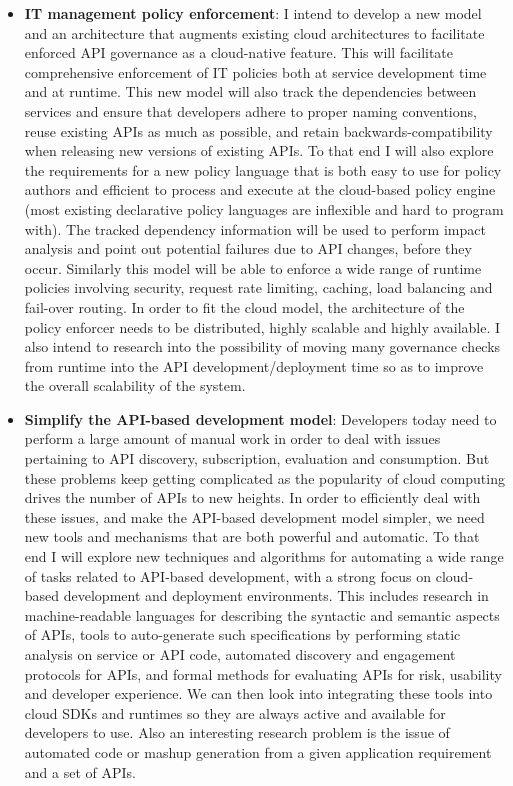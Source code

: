 \begin{itemize}
\item {\bf IT management policy enforcement}: I intend to develop a new
model and an architecture that augments existing cloud architectures to
facilitate enforced API governance as a cloud-native feature. This will
facilitate comprehensive enforcement of IT policies both at service
development time and at runtime. This new model will also track the dependencies
between services and ensure that developers adhere to proper naming conventions,
reuse existing APIs as much as possible, and retain backwards-compatibility when
releasing new versions of existing APIs. To that end I will also explore the
requirements for a new policy language that is both easy to use for policy authors
and efficient to process and execute at the cloud-based policy engine (most existing
declarative policy languages are inflexible and hard to program with). The tracked
dependency information will be used to perform impact analysis and point
out potential failures due to API changes, before they occur. Similarly this
model will be able to enforce a wide range of runtime policies involving security,
request rate limiting, caching, load balancing and fail-over routing. In order to fit the
cloud model, the architecture of the policy enforcer needs to be distributed, highly
scalable and highly available. I also intend to research into the possibility of
moving many governance checks from runtime into the API development/deployment
time so as to improve the overall scalability of the system.

\item {\bf Simplify the API-based development model}: Developers today need to perform
a large amount of manual work in order to deal with issues pertaining to API discovery,
subscription, evaluation and consumption. But these problems keep getting complicated
as the popularity of cloud computing drives the number of APIs to new heights. In order to
efficiently deal with these issues, and make the API-based development model
simpler, we need new tools and mechanisms that are both powerful and automatic. To
that end I will explore new techniques and algorithms for automating a wide range of tasks
related to API-based development, with a strong focus on cloud-based development and
deployment environments. This includes research in machine-readable languages for describing
the syntactic and semantic aspects of APIs, tools to auto-generate such specifications by
performing static analysis on service or API code, automated discovery and engagement
protocols for APIs, and formal methods for evaluating APIs for risk, usability and 
developer experience. We can then look into integrating these tools into cloud SDKs and
runtimes so they are always active and available for developers to use. Also an interesting research
problem is the issue of automated code or mashup generation from a given application
requirement and a set of APIs.


\end{itemize}
